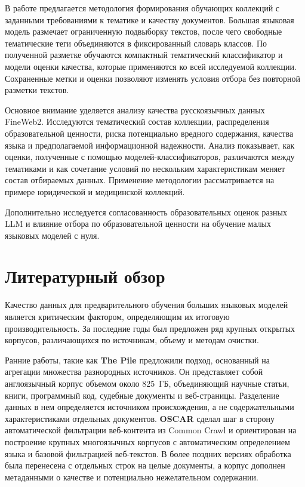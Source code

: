 \documentclass[12pt,a4paper]{article}
\begin{document}
В работе предлагается методология формирования обучающих коллекций
с заданными требованиями к тематике и качеству документов.
Большая языковая модель размечает ограниченную подвыборку текстов,
после чего свободные тематические теги объединяются в фиксированный словарь классов.
По полученной разметке обучаются компактный тематический классификатор и модели оценки качества,
которые применяются ко всей исследуемой коллекции.
Сохраненные метки и оценки позволяют изменять условия отбора без повторной разметки текстов.

Основное внимание уделяется анализу качества русскоязычных данных FineWeb2.
Исследуются тематический состав коллекции, распределения образовательной ценности,
риска потенциально вредного содержания, качества языка и предполагаемой информационной надежности.
Анализ показывает, как оценки, полученные с помощью моделей-классификаторов, различаются между тематиками
и как сочетание условий по нескольким характеристикам меняет состав отбираемых данных.
Применение методологии рассматривается на примере юридической и медицинской коллекций.

Дополнительно исследуется согласованность образовательных оценок разных LLM
и влияние отбора по образовательной ценности на обучение малых языковых моделей с нуля.

\section{Литературный обзор}

Качество данных для предварительного обучения больших языковых моделей является критическим фактором, 
определяющим их итоговую производительность. 
За последние годы был предложен ряд крупных открытых корпусов, различающихся по источникам, объему и методам очистки. 

Ранние работы, такие как \textbf{The Pile} \cite{pile} предложили подход, 
основанный на агрегации множества разнородных источников.
Он представляет собой англоязычный корпус объемом около 825~ГБ, 
объединяющий научные статьи, книги, программный код, судебные документы и веб-страницы. 
Разделение данных в нем определяется источником происхождения, 
а не содержательными характеристиками отдельных документов.
\textbf{OSCAR} \cite{oscar} сделал шаг в сторону автоматической фильтрации веб-контента из Common Crawl
и ориентирован на построение крупных многоязычных корпусов 
с автоматическим определением языка и базовой фильтрацией веб-текстов. 
В более поздних версиях обработка была перенесена с отдельных строк на целые документы, 
а корпус дополнен метаданными о качестве и потенциально нежелательном содержании.
\end{document}
